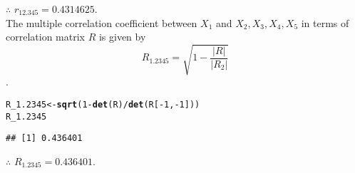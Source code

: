 \documentclass[11pt, a4paper]{article}\usepackage[]{graphicx}\usepackage[]{xcolor}
\makeatletter
\newcommand{\hlnum}[1]{\textcolor[rgb]{0.686,0.059,0.569}{#1}}%
\newcommand{\hlopt}[1]{\textcolor[rgb]{0,0,0}{#1}}%
\newcommand{\hldef}[1]{\textcolor[rgb]{0.345,0.345,0.345}{#1}}%
\newcommand{\hlkwb}[1]{\textcolor[rgb]{0.69,0.353,0.396}{#1}}%
\newcommand{\hlkwd}[1]{\textcolor[rgb]{0.737,0.353,0.396}{\textbf{#1}}}%
\newenvironment{kframe}{%
 \def\at@end@of@kframe{}%
 \ifinner\ifhmode%
  \def\at@end@of@kframe{\end{minipage}}%
  \begin{minipage}{\columnwidth}%
 \fi\fi%
 \def\FrameCommand##1{\hskip\@totalleftmargin \hskip-\fboxsep
 \colorbox{shadecolor}{##1}\hskip-\fboxsep
     \hskip-\linewidth \hskip-\@totalleftmargin \hskip\columnwidth}%
 \MakeFramed {\advance\hsize-\width
   \@totalleftmargin\z@ \linewidth\hsize
   \@setminipage}}%
 {\par\unskip\endMakeFramed%
 \at@end@of@kframe}
\newenvironment{knitrout}{}{} %
\makeatother
\begin{document}
$\therefore$ $r_{12.345} = 0.4314625$.\\[1em]


 \hspace{0.1cm} The multiple correlation coefficient between $X_1$ and $X_2, X_3, X_4, X_5$ in terms of correlation matrix $R$ is given by $$R_{1.2345} = \sqrt{1 - \dfrac{|R|}{|R_2|}}$$.

\begin{knitrout}
\color{fgcolor}\begin{kframe}
\begin{alltt}
\hldef{R_1.2345} \hlkwb{<-} \hlkwd{sqrt}\hldef{(}\hlnum{1} \hlopt{-} \hlkwd{det}\hldef{(R)} \hlopt{/} \hlkwd{det}\hldef{(R[}\hlopt{-}\hlnum{1}\hldef{,} \hlopt{-}\hlnum{1}\hldef{]))}
\hldef{R_1.2345}
\end{alltt}
\begin{verbatim}
## [1] 0.436401
\end{verbatim}
\end{kframe}
\end{knitrout}

$\therefore$ $R_{1.2345} = 0.436401.$
\end{document}
